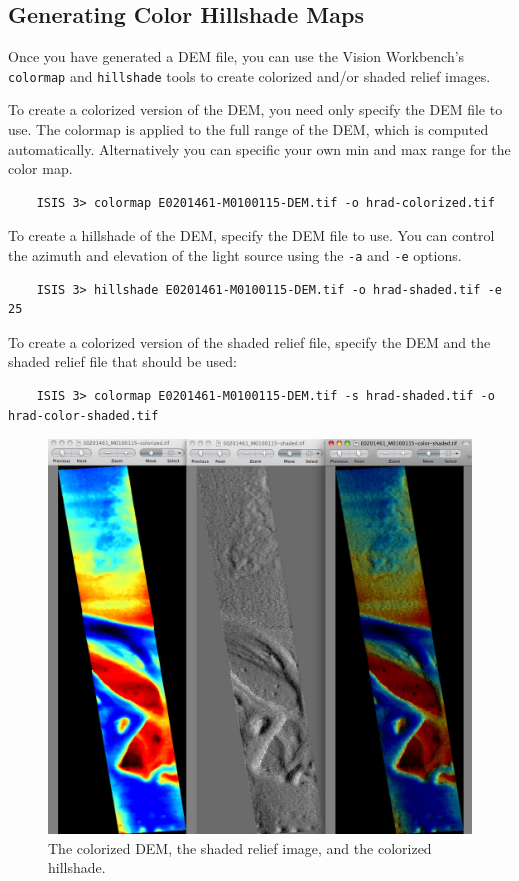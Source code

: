 \subsection{Generating Color Hillshade Maps}

Once you have generated a \ac{DEM} file, you can use the Vision Workbench's
\texttt{colormap} and \texttt{hillshade} tools to create colorized
and/or shaded relief images.

To create a colorized version of the \ac{DEM}, you need only specify
the \ac{DEM} file to use. The colormap is applied to the full range of
the DEM, which is computed automatically.  Alternatively you can
specific your own min and max range for the color map.

\begin{verbatim}
    ISIS 3> colormap E0201461-M0100115-DEM.tif -o hrad-colorized.tif
\end{verbatim}

To create a hillshade of the \ac{DEM}, specify the \ac{DEM} file to
use. You can control the azimuth and elevation of the light source
using the \texttt{-a} and \texttt{-e} options.

\begin{verbatim}
    ISIS 3> hillshade E0201461-M0100115-DEM.tif -o hrad-shaded.tif -e 25
\end{verbatim}

To create a colorized version of the shaded relief file, specify
the \ac{DEM} and the shaded relief file that should be used:

\begin{verbatim}
    ISIS 3> colormap E0201461-M0100115-DEM.tif -s hrad-shaded.tif -o hrad-color-shaded.tif
\end{verbatim}

\begin{figure}
\begin{center}
\includegraphics[width=5in]{images/p19-colorized-shaded.png}
\caption[Hrad colorized and shaded relief]{
    \label{hrad-color}
	The colorized DEM, the shaded relief image, and the colorized hillshade.
    }
\end{center}
\end{figure}

